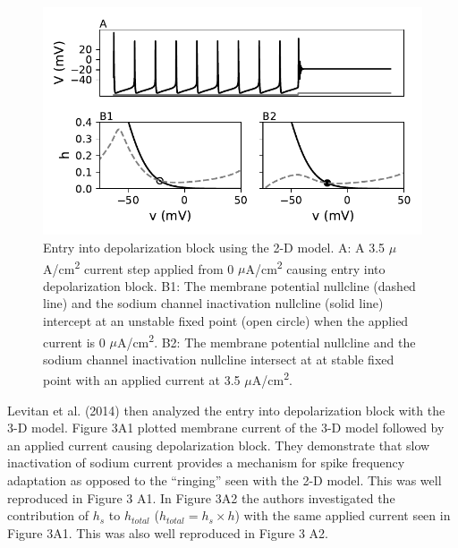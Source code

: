 \begin{figure}
	\centering
	\includegraphics[scale=0.7]{../figures/figure_2.pdf}
	\caption{Entry into depolarization block using the 2-D model. A: A 3.5 $\mu$A/cm\textsuperscript{2} current step applied from 0 $\mu$A/cm\textsuperscript{2} causing entry into depolarization block. B1: The membrane potential nullcline (dashed line) and the sodium channel inactivation nullcline (solid line) intercept at an unstable fixed point (open circle) when the applied current is 0 $\mu$A/cm\textsuperscript{2}. B2: The membrane potential nullcline and the sodium channel inactivation nullcline intersect at at stable fixed point with an applied current at 3.5 $\mu$A/cm\textsuperscript{2}.}
	\label{fig:2}
\end{figure}

Levitan et al. (2014) then analyzed the entry into depolarization block with the 3-D model. Figure 3A1 plotted membrane current of the 3-D model followed by an applied current causing depolarization block. They demonstrate that slow inactivation of sodium current provides a mechanism for spike frequency adaptation as opposed to the “ringing” seen with the 2-D model. This was well reproduced in Figure 3 A1. In Figure 3A2 the authors investigated the contribution of $h_s$ to $h_{total}$ ($h_{total}= h_{s} \times h$) with the same applied current seen in Figure 3A1. This was also well reproduced in Figure 3 A2. \\

